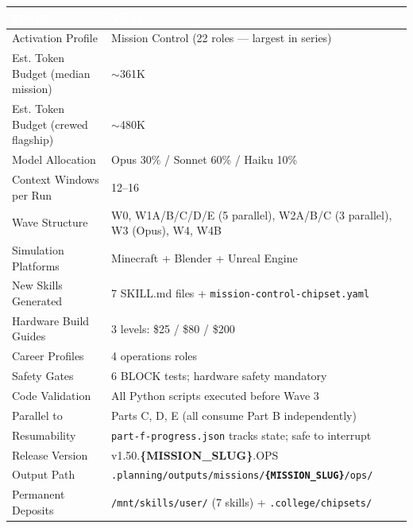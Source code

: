 \documentclass[11pt,letterpaper]{article}
\newcommand{\param}[1]{\textcolor{paramred}{\textbf{\{#1\}}}}
\newcommand{\tableheader}[1]{\textbf{\sffamily\textcolor{white}{#1}}}
\begin{document}
\begin{center}
\begin{tabularx}{\textwidth}{L{6cm}X}
\toprule
{}
\tableheader{Metric} & \tableheader{Value} \\
\midrule
Activation Profile & Mission Control (22 roles --- largest in series) \\
Est. Token Budget (median mission) & $\sim$361K \\
Est. Token Budget (crewed flagship) & $\sim$480K \\
Model Allocation & Opus 30\% / Sonnet 60\% / Haiku 10\% \\
Context Windows per Run & 12--16 \\
Wave Structure & W0, W1A/B/C/D/E (5 parallel), W2A/B/C (3 parallel), W3 (Opus), W4, W4B \\
Simulation Platforms & Minecraft + Blender + Unreal Engine \\
New Skills Generated & 7 SKILL.md files + \texttt{mission-control-chipset.yaml} \\
Hardware Build Guides & 3 levels: \$25 / \$80 / \$200 \\
Career Profiles & 4 operations roles \\
Safety Gates & 6 BLOCK tests; hardware safety mandatory \\
Code Validation & All Python scripts executed before Wave 3 \\
Parallel to & Parts C, D, E (all consume Part B independently) \\
Resumability & \texttt{part-f-progress.json} tracks state; safe to interrupt \\
Release Version & v1.50.\param{MISSION\_SLUG}.OPS \\
Output Path & \texttt{.planning/outputs/missions/\param{MISSION\_SLUG}/ops/} \\
Permanent Deposits & \texttt{/mnt/skills/user/} (7 skills) + \texttt{.college/chipsets/} \\
\bottomrule
\end{tabularx}
\end{center}

\vspace{2em}
\end{document}
